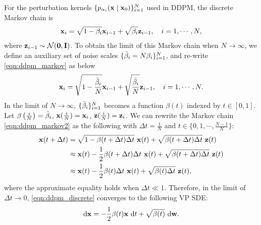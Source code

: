 For the perturbation kernels $\{p_{\alpha_i}(\mathbf{x} \mid \mathbf{x}_0)\}_{i=1}^N$ used in DDPM, the discrete Markov chain is
\begin{align}
    \mathbf{x}_i = \sqrt{1-\beta_{i}} \mathbf{x}_{i-1} + \sqrt{\beta_{i}} \mathbf{z}_{i-1}, \quad i=1,\cdots,N, \label{eqn:ddpm_markov}
\end{align}
where $\mathbf{z}_{i-1} \sim \mathcal{N}(\mathbf{0}, \mathbf{I})$. To obtain the limit of this Markov chain when $N\to\infty$, we define an auxiliary set of noise scales $\{\bar{\beta}_i = N \beta_i\}_{i=1}^N$, and re-write \cref{eqn:ddpm_markov} as below
\begin{align}
    \mathbf{x}_i = \sqrt{1-\frac{\bar{\beta}_{i}}{N}} \mathbf{x}_{i-1} + \sqrt{\frac{\bar{\beta}_{i}}{N}} \mathbf{z}_{i-1}, \quad i=1,\cdots,N. \label{eqn:ddpm_markov2}
\end{align}
In the limit of $N\to \infty$, $\{\bar{\beta}_i\}_{i=1}^N$ becomes a function $\beta(t)$ indexed by $t \in [0, 1]$. Let $\beta\left(\frac{i}{N}\right) = \bar{\beta}_i$, $\mathbf{x}(\frac{i}{N}) = \mathbf{x}_i$, $\mathbf{z}(\frac{i}{N}) = \mathbf{z}_i$. We can rewrite the Markov chain \cref{eqn:ddpm_markov2} as the following with $\Delta t = \frac{1}{N}$ and $t \in \{0, 1, \cdots, \frac{N-1}{N}\}$:
\begin{align}
\mathbf{x}(t + \Delta t) &= \sqrt{1 - \beta(t + \Delta t)\Delta t} ~\mathbf{x}(t) + \sqrt{\beta(t + \Delta t)\Delta t}~ \mathbf{z}(t) \notag\\
&\approx \mathbf{x}(t) -\frac{1}{2}\beta(t + \Delta t)\Delta t~\mathbf{x}(t) + \sqrt{\beta(t+\Delta t)\Delta t}~\mathbf{z}(t) \notag\\
&\approx \mathbf{x}(t) -\frac{1}{2}\beta(t)\Delta t~\mathbf{x}(t) + \sqrt{\beta(t)\Delta t}~ \mathbf{z}(t), \label{eqn:ddpm_discrete}
\end{align}
where the approximate equality holds when $\Delta t \ll 1$.
Therefore, in the limit of $\Delta t \to 0$, \cref{eqn:ddpm_discrete} converges to the following VP SDE:
\begin{align}
\mathrm{d} \mathbf{x} = -\frac{1}{2}\beta(t) \mathbf{x}~ \mathrm{d} t + \sqrt{\beta(t)} ~\mathrm{d} \mathbf{w}.
\end{align}


